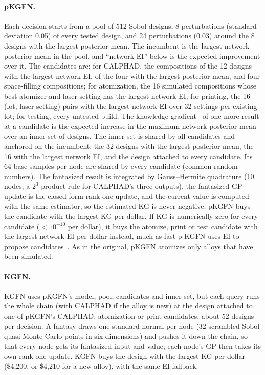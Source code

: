 \documentclass[11pt]{article}
\begin{document}
\paragraph{pKGFN.} Each decision starts from a pool of 512 Sobol designs, 8
perturbations (standard deviation 0.05) of every tested design, and 24
perturbations (0.03) around the 8 designs with the largest posterior mean. The
incumbent is the largest network posterior mean in the pool, and ``network EI''
below is the expected improvement over it. The candidates are: for CALPHAD, the
compositions of the 12 designs with the largest network EI, of the four with
the largest posterior mean, and four space-filling compositions; for
atomization, the 16 simulated compositions whose best atomizer-and-laser
setting has the largest network EI; for printing, the 16 (lot, laser-setting)
pairs with the largest network EI over 32 settings per existing lot; for
testing, every untested build. The knowledge gradient~\cite{frazier2009,frazier2018} of one more result at a
candidate is the expected increase in the maximum network posterior mean over
an inner set of designs. The inner set is shared by all candidates and anchored
on the incumbent: the 32 designs with the largest posterior mean, the 16 with
the largest network EI, and the design attached to every candidate. Its 64 base
samples per node are shared by every candidate (common random numbers). The
fantasized result is integrated by Gauss--Hermite quadrature (10 nodes; a
$2^3$ product rule for CALPHAD's three outputs), the fantasized GP update is the
closed-form rank-one update, and the current value is computed with the same
estimator, so the estimated KG is never negative. pKGFN buys the candidate with
the largest KG per dollar. If KG is numerically zero for every candidate
($<10^{-10}$ per dollar), it buys the atomize, print or test candidate with the
largest network EI per dollar instead, much as fast p-KGFN uses EI to propose
candidates~\cite{buathong2025}. As in the original, pKGFN atomizes only alloys
that have been simulated.

\paragraph{KGFN.} KGFN uses pKGFN's model, pool, candidates and inner set, but
each query runs the whole chain (with CALPHAD if the alloy is new) at the
design attached to one of pKGFN's CALPHAD, atomization or print candidates,
about 52 designs per decision. A fantasy draws one standard normal per node
(32 scrambled-Sobol quasi-Monte Carlo points in six dimensions) and pushes it
down the chain, so that every node gets its fantasized input and value; each
node's GP then takes its own rank-one update. KGFN buys the design with the
largest KG per dollar (\$4,200, or \$4,210 for a new alloy), with the same EI
fallback.
\end{document}
